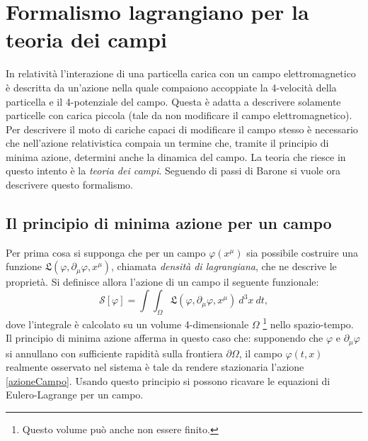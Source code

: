 \section{Formalismo lagrangiano per la teoria dei campi}
In relatività l'interazione di una particella carica con un campo elettromagnetico è descritta da un'azione nella quale compaiono accoppiate la 4-velocità della particella e il 4-potenziale del campo. Questa è adatta a descrivere solamente particelle con carica piccola (tale da non modificare il campo elettromagnetico). Per descrivere il moto di cariche capaci di modificare il campo stesso è necessario che nell'azione relativistica compaia un termine che, tramite il principio di minima azione, determini anche la dinamica del campo. La teoria che riesce in questo intento è la \emph{teoria dei campi}.
\label{sec:lagCampi}
Seguendo di passi di Barone \cite{Barone} si vuole ora descrivere questo formalismo.
\subsection{Il principio di minima azione per un campo}
Per prima cosa si supponga che per un campo $\varphi(x^\mu)$ sia possibile costruire una funzione $\mathfrak{L}(\varphi,\partial_\mu\varphi,x^\mu)$, chiamata \emph{densità di lagrangiana}, che ne descrive le proprietà.
Si definisce allora l'azione di un campo il seguente funzionale:
\begin{equation}
    \mathcal{S}[\varphi]=\int\int_{\Omega}\mathfrak{L}(\varphi,\partial_\mu\varphi,x^\mu)\ d^3x\ dt,\label{azioneCampo}
\end{equation}
dove l'integrale è calcolato su un volume 4-dimensionale $\Omega$ \footnote{Questo volume può anche non essere finito.} nello spazio-tempo.\\
Il principio di minima azione afferma in questo caso che: supponendo che $\varphi$ e $\partial_\mu\varphi$ si annullano con sufficiente rapidità sulla frontiera $\partial\Omega$, il campo $\varphi(t,x)$ realmente osservato nel sistema è tale da rendere stazionaria l'azione \eqref{azioneCampo}. Usando questo principio si possono ricavare le equazioni di Eulero-Lagrange per un campo.\\

